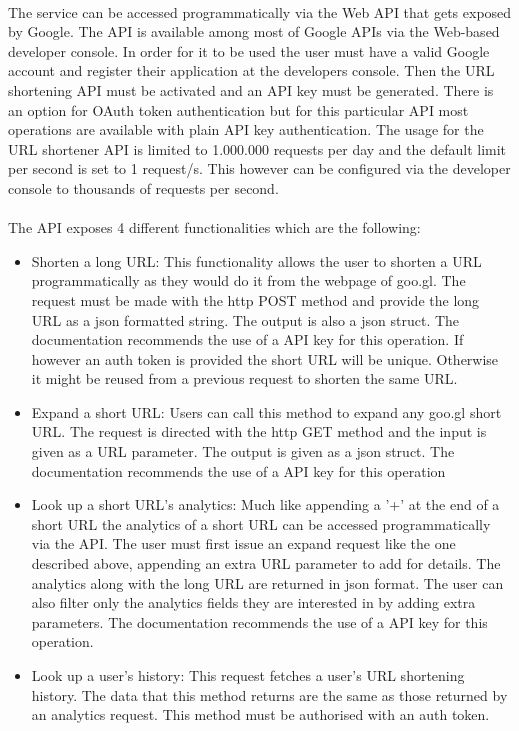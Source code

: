 \documentclass[12pt]{article}
\begin{document}
\paragraph{}
The service can be accessed programmatically via the Web API that gets exposed by Google. The API is available among most of Google APIs via the Web-based developer console. In order for it to be used the user must have a valid Google account and register their application at the developers console. Then the URL shortening API must be activated and an API key must be generated. There is an option for OAuth token authentication but for this particular API most operations are available with plain API key authentication. The usage for the URL shortener API is limited to 1.000.000 requests per day and the default limit per second is set to 1 request/s. This however can be configured via the developer console to thousands of requests per second. 

\paragraph{}
The API exposes 4 different functionalities which are the following: 

\begin{itemize}

\item {Shorten a long URL:  This functionality allows the user to shorten a URL programmatically as they would do it from the webpage of goo.gl. The request must be made with the http POST method and provide the long URL as a json formatted string. The output is also a json struct. The documentation recommends the use of a API key for this operation. If however an auth token is provided the short URL will be unique. Otherwise it might be reused from a previous request to shorten the same URL.}
\item {Expand a short URL: Users can call this method to expand any goo.gl short URL. The request is directed with the http GET method and the input is given as a URL parameter.  The output is given as a json struct. The documentation recommends the use of a API key for this operation}
\item {Look up a short URL's analytics: Much like appending a '+' at the end of a short URL the analytics of a short URL can be accessed programmatically via the API. The user must first issue an expand request like the one described above, appending an extra URL parameter to add for details. The analytics along with the long URL are returned in json format. The user can also filter only the analytics fields they are interested in by adding extra parameters. The documentation recommends the use of a API key for this operation.}
\item{Look up a user's history: This request fetches a user's URL shortening history. The data that this method returns are the same as those returned by an analytics request. This method must be authorised with an auth token.  }
\end{itemize}
\end{document}
